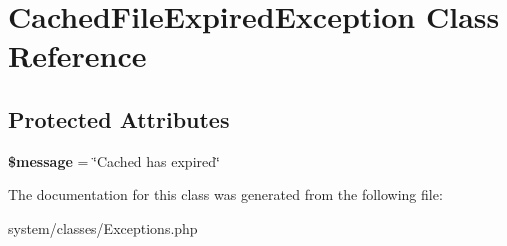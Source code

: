 \hypertarget{class_cached_file_expired_exception}{
\section{CachedFileExpiredException Class Reference}
\label{class_cached_file_expired_exception}
}
\subsection*{Protected Attributes}
\begin{DoxyCompactItemize}
\item 
\hypertarget{class_cached_file_expired_exception_abf17cb2dba2ed17cb28aa5f37deb5293}{
{\bfseries \$message} = \char`\"{}Cached has expired\char`\"{}}
\label{class_cached_file_expired_exception_abf17cb2dba2ed17cb28aa5f37deb5293}

\end{DoxyCompactItemize}


The documentation for this class was generated from the following file:\begin{DoxyCompactItemize}
\item 
system/classes/Exceptions.php\end{DoxyCompactItemize}
